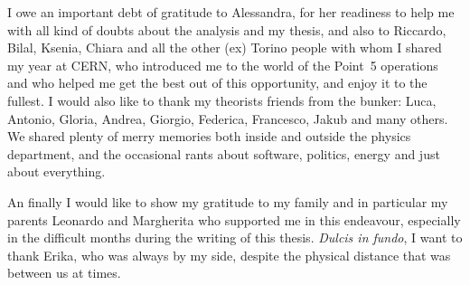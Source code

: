 I owe an important debt of gratitude to
Alessandra, for her readiness to help me with all kind of doubts about the analysis and my thesis, and also to
Riccardo, Bilal, Ksenia, Chiara and all the other (ex) Torino people with whom I shared my year at CERN,
who introduced me to the world of the Point~5 operations and
who helped me get the best out of this opportunity, and enjoy it to the fullest.
I would also like to thank my theorists friends from the bunker:
Luca, Antonio, Gloria, Andrea, Giorgio, Federica, Francesco, Jakub and many others.
We shared plenty of merry memories both inside and outside the physics department,
and the occasional rants about software, politics, energy and just about everything.


An finally I would like to show my gratitude to my family and in particular
my parents Leonardo and Margherita who supported me in this endeavour, especially in the difficult months during the writing of this thesis.
\textit{Dulcis in fundo}, I want to thank
Erika, who was always by my side, despite the physical distance that was between us at times.
